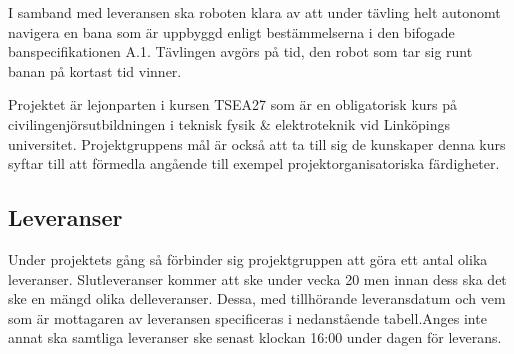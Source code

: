 \documentclass[a4paper,12pt]{article}
\begin{document}
I samband med leveransen ska roboten klara av att under tävling helt autonomt navigera en bana som är uppbyggd enligt bestämmelserna i den bifogade banspecifikationen A.1. Tävlingen avgörs på tid, den robot som tar sig runt banan på kortast tid vinner. 

Projektet är lejonparten i kursen TSEA27  som är en obligatorisk kurs på civilingenjörsutbildningen i teknisk fysik & elektroteknik vid Linköpings universitet. Projektgruppens mål är också att ta till sig de kunskaper denna kurs syftar till att förmedla angående till exempel projektorganisatoriska färdigheter.
 
\subsection{Leveranser}
Under projektets gång så förbinder sig projektgruppen att göra ett antal olika leveranser. Slutleveranser kommer att ske under vecka 20 men innan dess ska det ske en mängd olika delleveranser. Dessa, med tillhörande leveransdatum och vem som är mottagaren av leveransen specificeras i nedanstående tabell.Anges inte annat ska samtliga leveranser ske senast klockan 16:00 under dagen för leverans.
\end{document}
